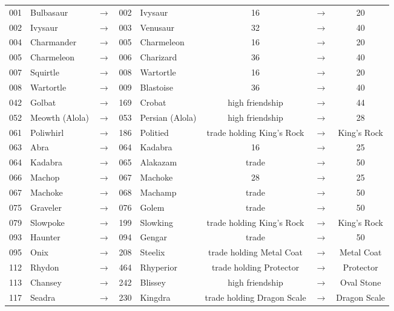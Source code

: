 \documentclass{article}
\begin{document}
\small
\begin{longtable}{rlcrl|ccc}
\hline
001 & Bulbasaur & $\rightarrow$ & 002 & Ivysaur & 16 & $\rightarrow$ & 20 \\
002 & Ivysaur & $\rightarrow$ & 003 & Venusaur & 32 & $\rightarrow$ & 40 \\
004 & Charmander & $\rightarrow$ & 005 & Charmeleon & 16 & $\rightarrow$ & 20 \\
005 & Charmeleon & $\rightarrow$ & 006 & Charizard & 36 & $\rightarrow$ & 40 \\
007 & Squirtle & $\rightarrow$ & 008 & Wartortle & 16 & $\rightarrow$ & 20 \\
008 & Wartortle & $\rightarrow$ & 009 & Blastoise & 36 & $\rightarrow$ & 40 \\
042 & Golbat & $\rightarrow$ & 169 & Crobat & high friendship & $\rightarrow$ & 44 \\
052 & Meowth (Alola) & $\rightarrow$ & 053 & Persian (Alola) & high friendship & $\rightarrow$ & 28 \\
061 & Poliwhirl & $\rightarrow$ & 186 & Politied & trade holding King's Rock & $\rightarrow$ & King's Rock \\
063 & Abra & $\rightarrow$ & 064 & Kadabra & 16 & $\rightarrow$ & 25 \\
064 & Kadabra & $\rightarrow$ & 065 & Alakazam & trade & $\rightarrow$ & 50 \\
066 & Machop & $\rightarrow$ & 067 & Machoke & 28 & $\rightarrow$ & 25 \\
067 & Machoke & $\rightarrow$ & 068 & Machamp & trade & $\rightarrow$ & 50 \\
075 & Graveler & $\rightarrow$ & 076 & Golem & trade & $\rightarrow$ & 50 \\
079 & Slowpoke & $\rightarrow$ & 199 & Slowking & trade holding King's Rock & $\rightarrow$ & King's Rock \\
093 & Haunter & $\rightarrow$ & 094 & Gengar & trade & $\rightarrow$ & 50 \\
095 & Onix & $\rightarrow$ & 208 & Steelix & trade holding Metal Coat & $\rightarrow$ & Metal Coat \\
112 & Rhydon & $\rightarrow$ & 464 & Rhyperior & trade holding Protector & $\rightarrow$ & Protector \\
113 & Chansey & $\rightarrow$ & 242 & Blissey & high friendship & $\rightarrow$ & Oval Stone \\
117 & Seadra & $\rightarrow$ & 230 & Kingdra & trade holding Dragon Scale & $\rightarrow$ & Dragon Scale \\

\end{longtable}
\end{document}
